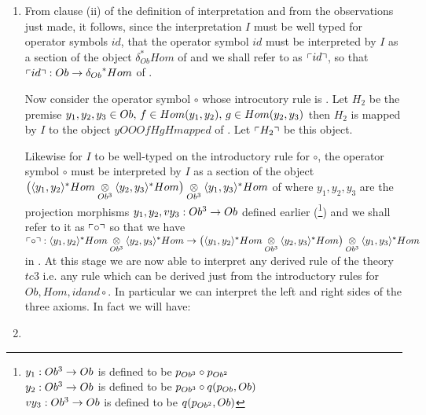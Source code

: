 \begin{enumerate}[$tc_1$]
\item 
From clause (ii) of the definition of interpretation and from the observations just  made, it
follows, since the interpretation $I$ must be well typed for operator symbols $id$,
that the operator symbol $id$ must be interpreted by $I$ as a section of the object $\delta_{Ob}^*Hom$ of \catcw
and we shall refer to as $\left\ulcorner id\right\urcorner$, so that $\left\ulcorner id\right\urcorner : Ob \rightarrow {\delta_{Ob}}^*Hom$ of \catc. 

Now consider the operator symbol $\circ$ whose introcutory rule is
.
Let $H_2$ be the premise $y_1,y_2,y_3 \in Ob,\,f \in Hom(y_1,y_2),\,g \in Hom(y_2,y_3)$ then $H_2$ is mapped by $I$ to the object $yOOOfHgHmapped$ of \catc.
Let $\left\ulcorner H_2\right\urcorner$ be this object. 
 

Likewise for $I$ to be well-typed on the introductory rule for $\circ$, the operator symbol $\circ$ must be interpreted by $I$ as a section of the object 
$\big(\langle y_1,y_2\rangle^*Hom \underset{Ob^3}{\otimes} \langle y_2,y_3\rangle^*Hom\big) \underset{Ob^3}{\otimes} {\langle y_1,y_3\rangle^*Hom}$ of \catcw 
where $y_1,y_2,y_3$ are the projection morphisms $y_1,y_2,vy_3: Ob^3 \rightarrow Ob$ defined earlier (\tbd\footnote{
$y_1: Ob^3 \rightarrow Ob$ is defined to be $p_{Ob^3} \circ p_{Ob^2}$ \\
$y_2: Ob^3 \rightarrow Ob$ is defined to be $p_{Ob^3} \circ q(p_{Ob},Ob)$\\
$vy_3: Ob^3 \rightarrow Ob$ is defined to be $q(p_{Ob^2},Ob)$
}) and we shall refer to it as $\left\ulcorner\circ\right\urcorner$ so that we have $\left\ulcorner\circ\right\urcorner: \langle y_1,y_2\rangle^*Hom \underset{Ob^3}{\otimes} \langle y_2,y_3\rangle^*Hom \rightarrow \big(\langle y_1,y_2\rangle^*Hom \underset{Ob^3}{\otimes} \langle y_2,y_3\rangle^*Hom\big) \underset{Ob^3}{\otimes} {\langle y_1,y_3\rangle^*Hom}$ in \catc.
At this stage we are now able to interpret any derived rule of the theory $tc3$ i.e. any rule 
which can be derived just from the introductory rules for $Ob, Hom, id and \circ$. In particular we can
interpret the left and right sides of the three axioms. In fact we will have: 

 
\item %
\end{enumerate}
\fi


\newcommand{\gatinterpretationcontext}[1]{&\multicolumn{5}{p{15cm}}{#1}}


\newcommand{\compfour}{\tuple{y_1,y_2}^*Hom}
\newcommand{\compfive}{\tuple{\dot y_2,\dot y_3}^*Hom}
\newcommand{\compsix}{\tuple{\ddot y_1,\ddot y_3}^*Hom}


\newcommand{\leftidentitymapped}{\tuple{x_1,x_1,x_2,x_1\circ \fid,id_{Hom}}^*\fcomp=s(id_{Hom})}

\newcommand{\rightidentitymapped}{\tuple{x_1,x_1,x_2,id_{Hom},x_2\circ \fid}^*\fcomp=s(id_{Hom})}


